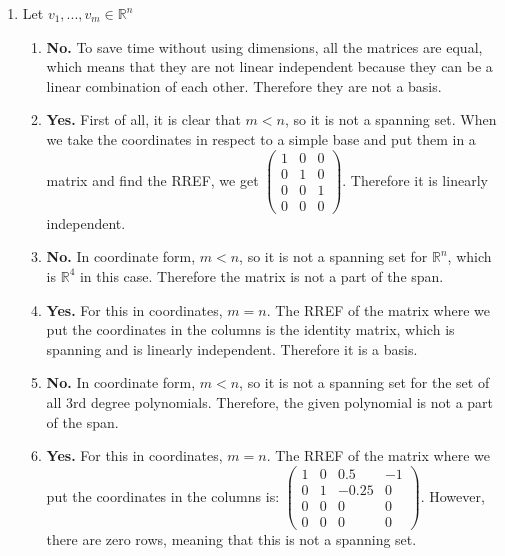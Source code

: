 \documentclass{article}
\begin{document}
\begin{enumerate}
\begin{enumerate}
\end{enumerate}

\item Let $v_1,...,v_m \in \mathbb{R}^n$


\begin{enumerate}

\item \textbf{No.} To save time without using dimensions, all the matrices are equal, which means that they are not linear independent because they can be a linear combination of each other. Therefore they are not a basis.

\item \textbf{Yes.} First of all, it is clear that $m < n$, so it is not a spanning set. When we take the coordinates in respect to a simple base and put them in a matrix and find the RREF, we get $\left(\begin{array}{ccc} 1 & 0 & 0 \\ 0 & 1 & 0 \\ 0 & 0 & 1 \\ 0 & 0 & 0 \end{array}\right)$. Therefore it is linearly independent.

\item \textbf{No.} In coordinate form, $m < n$, so it is not a spanning set for $\mathbb{R}^n$, which is $\mathbb{R}^4$ in this case. Therefore the matrix is not a part of the span.

\item \textbf{Yes.} For this in coordinates, $m = n$. The RREF of the  matrix where we put the coordinates in the columns is the identity matrix, which is spanning and is linearly independent. Therefore it is a basis.

\item \textbf{No.} In coordinate form, $m < n$, so it is not a spanning set for the set of all 3rd degree polynomials. Therefore, the given polynomial is not a part of the span.

\item \textbf{Yes.} For this in coordinates, $m = n$. The RREF of the matrix where we put the coordinates in the columns is: $\left(\begin{array}{cccc} 1 & 0 & 0.5 & -1 \\ 0 & 1 & -0.25 & 0 \\ 0 & 0 & 0 & 0 \\ 0 & 0 & 0 & 0 \end{array}\right)$. However, there are zero rows, meaning that this is not a spanning set.


\end{enumerate}
\end{enumerate}
\end{document}
